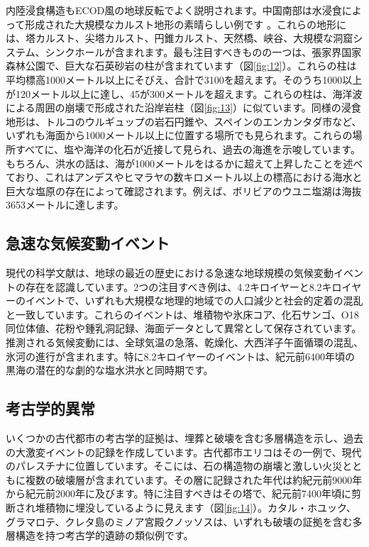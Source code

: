 \documentclass[10pt,twocolumn,letterpaper]{article}
\begin{document}
内陸浸食構造もECOD風の地球反転でよく説明されます。中国南部は水浸食によって形成された大規模なカルスト地形の素晴らしい例です \cite{82}。これらの地形には、塔カルスト、尖塔カルスト、円錐カルスト、天然橋、峡谷、大規模な洞窟システム、シンクホールが含まれます。最も注目すべきものの一つは、張家界国家森林公園で、巨大な石英砂岩の柱が含まれています（図\ref{fig:12}）\cite{84}。これらの柱は平均標高1000メートル以上にそびえ、合計で3100を超えます。そのうち1000以上が120メートル以上に達し、45が300メートルを超えます\cite{85}。これらの柱は、海洋波による周囲の崩壊で形成された沿岸岩柱（図\ref{fig:13}）に似ています。同様の浸食地形は、トルコのウルギュップの岩石円錐や、スペインのエンカンタダ市など、いずれも海面から1000メートル以上に位置する場所でも見られます。これらの場所すべてに、塩や海洋の化石が近接して見られ、過去の海進を示唆しています\cite{15,86,87}。もちろん、洪水の話\cite{3}は、海が1000メートルをはるかに超えて上昇したことを述べており、これはアンデスやヒマラヤの数キロメートル以上の標高における海水と巨大な塩原の存在によって確認されます。例えば、ボリビアのウユニ塩湖は海抜3653メートルに達します\cite{94}。

\subsection{急速な気候変動イベント}

現代の科学文献は、地球の最近の歴史における急速な地球規模の気候変動イベントの存在を認識しています。2つの注目すべき例は、4.2キロイヤーと8.2キロイヤーのイベントで、いずれも大規模な地理的地域での人口減少と社会的定着の混乱と一致しています。これらのイベントは、堆積物や氷床コア、化石サンゴ、O18同位体値、花粉や鍾乳洞記録、海面データとして異常として保存されています。推測される気候変動には、全球気温の急落、乾燥化、大西洋子午面循環の混乱、氷河の進行が含まれます\cite{90,91,92}。特に8.2キロイヤーのイベントは、紀元前6400年頃の黒海の潜在的な劇的な塩水洪水と同時期です\cite{93}。

\subsection{考古学的異常}

いくつかの古代都市の考古学的証拠は、埋葬と破壊を含む多層構造を示し、過去の大激変イベントの記録を作成しています。古代都市エリコはその一例で、現代のパレスチナに位置しています。そこには、石の構造物の崩壊と激しい火災とともに複数の破壊層が含まれています\cite{96,97}。その層に記録された年代は約紀元前9000年から紀元前2000年に及びます。特に注目すべきはその塔で、紀元前7400年頃に剪断され堆積物に埋没しているように見えます（図\ref{fig:14}）\cite{95}。カタル・ホユック\cite{99}、グラマロテ\cite{98}、クレタ島のミノア宮殿クノッソス\cite{100,101}は、いずれも破壊の証拠を含む多層構造を持つ考古学的遺跡の類似例です。
\end{document}

